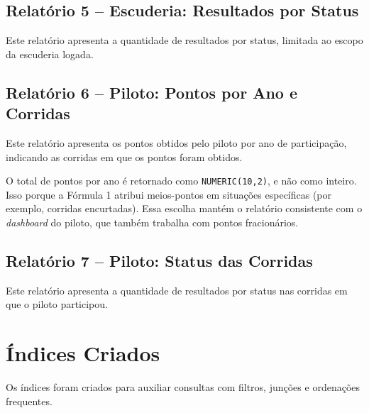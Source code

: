 \documentclass[12pt,a4paper]{article}
\begin{document}
\subsection{Relatório 5 -- Escuderia: Resultados por Status}

Este relatório apresenta a quantidade de resultados por status, limitada ao escopo da escuderia logada.
\subsection{Relatório 6 -- Piloto: Pontos por Ano e Corridas}

Este relatório apresenta os pontos obtidos pelo piloto por ano de participação, indicando as corridas em que os pontos foram obtidos.

O total de pontos por ano é retornado como \texttt{NUMERIC(10,2)}, e não como inteiro. Isso porque a Fórmula 1 atribui meios-pontos em situações específicas (por exemplo, corridas encurtadas). Essa escolha mantém o relatório consistente com o \textit{dashboard} do piloto, que também trabalha com pontos fracionários.

\subsection{Relatório 7 -- Piloto: Status das Corridas}
Este relatório apresenta a quantidade de resultados por status nas corridas em que o piloto participou.

\section{Índices Criados}

Os índices foram criados para auxiliar consultas com filtros, junções e ordenações frequentes.
\end{document}

